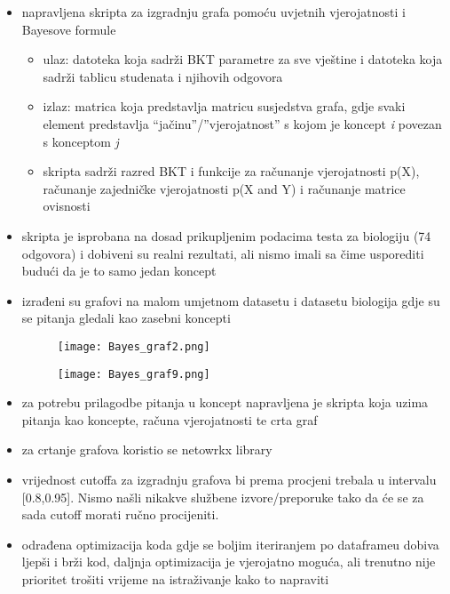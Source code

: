 		\begin{itemize}
			\item napravljena skripta za izgradnju grafa pomoću uvjetnih vjerojatnosti i Bayesove formule
			\begin{itemize}
				\item ulaz: datoteka koja sadrži BKT parametre za sve vještine i datoteka koja sadrži tablicu studenata i njihovih odgovora
				\item izlaz: matrica koja predstavlja matricu susjedstva grafa, gdje svaki element predstavlja “jačinu”/”vjerojatnost” s kojom je koncept \textit{i} povezan s konceptom \textit{j}
				\item skripta sadrži razred BKT i funkcije za računanje vjerojatnosti p(X), računanje zajedničke vjerojatnosti p(X and Y) i računanje matrice ovisnosti
			\end{itemize}
			\item skripta je isprobana na dosad prikupljenim podacima testa za biologiju (74 odgovora) i dobiveni su realni rezultati, ali nismo imali sa čime usporediti budući da je to samo jedan koncept
			\item izrađeni su grafovi na malom umjetnom datasetu i datasetu biologija gdje su se pitanja gledali kao zasebni koncepti
				\begin{figure}[!htb]
				\centering
				\texttt{[image: Bayes\_graf2.png]}
				\caption{}
				\label{}
			\end{figure}
			
				\begin{figure}[!htb]
				\centering
				\texttt{[image: Bayes\_graf9.png]}
				\caption{}
				\label{}
			\end{figure}
			\item za potrebu prilagodbe pitanja u koncept napravljena je skripta koja uzima pitanja kao koncepte, računa vjerojatnosti te crta graf
			\item za crtanje grafova koristio se netowrkx library
			\item vrijednost cutoffa za izgradnju grafova bi prema procjeni trebala u intervalu [0.8,0.95]. Nismo našli nikakve službene izvore/preporuke tako da  će se za sada cutoff morati ručno procijeniti.
			\item odrađena optimizacija koda gdje se boljim iteriranjem po dataframeu dobiva ljepši i brži kod, daljnja optimizacija je vjerojatno moguća, ali trenutno nije prioritet trošiti vrijeme na istraživanje kako to napraviti
		\end{itemize}
